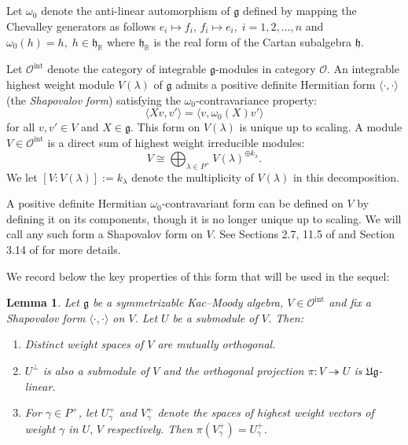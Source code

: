 \documentclass[12pt,reqno]{amsart}
\theoremstyle{plain}
\newtheorem{lemma}[theorem]{Lemma}
\theoremstyle{definition}
\theoremstyle{remark}
\theoremstyle{plain}
\newcommand{\cato}{\mathcal{O}}
\newcommand{\catoint}{\mathcal{O}^{\mathrm{int}}}
\newcommand{\lie}{\mathfrak}
\begin{document}
\subsection{}
Let $\omega_0$ denote the anti-linear automorphism of $\mathfrak g$ defined by mapping the Chevalley generators as follows $e_i\mapsto f_i, \,f_i\mapsto e_i, \;i=1,2,\ldots,n$ and $\omega_0(h)=h, \;h\in \mathfrak{h}_{\mathbb{R}}$ where ${\lie h}_\mathbb{R}$ is the real form of the Cartan subalgebra $\lie h$.

Let $\catoint$ denote the category of integrable $\lie g$-modules in category $\cato$. An integrable highest weight module $V(\lambda)$ of $\lie g$ admits a positive definite Hermitian form $\langle \cdot, \cdot \rangle$ (the {\em Shapovalov form}) satisfying the $\omega_0$-contravariance property:
 \[ \langle Xv, v' \rangle = \langle v, \omega_0(X) v' \rangle \]
    for all $v, v' \in V$ and $X \in \lie g$.
This form on $V(\lambda)$ is unique up to scaling. A module $V \in \catoint$ is a direct sum of highest weight irreducible modules:
\[ V \cong \bigoplus_{\lambda \in P^+} V(\lambda)^{\oplus k_\lambda}.\]
We let $[V:V(\lambda)] :=k_\lambda$ denote the multiplicity of $V(\lambda)$ in this decomposition.

A positive definite Hermitian $\omega_0$-contravariant form can be defined on $V$ by defining it on its components, though it is no longer unique up to scaling. We will call any such form a Shapovalov form on $V$.
See Sections 2.7, 11.5 of \cite{Kac} and Section 3.14 of \cite{Hum2} for more details.

We record below the key properties of this form that will be used in the sequel:
\begin{lemma}\label{lem:shap-props}
    Let $\lie g$  be a symmetrizable Kac--Moody algebra, $V \in \catoint$ and fix  a Shapovalov form $\langle \cdot, \cdot \rangle$ on $V$. Let $U$ be a submodule of $V$. Then:
    \begin{enumerate}
        \item Distinct weight spaces of $V$ are mutually orthogonal.
        \item $U^\perp$ is also a submodule of $V$ and 
        the orthogonal projection $\pi: V \twoheadrightarrow U$ is $\lie{Ug}$-linear. 
        \item For $\gamma \in P^+$, let $U^+_\gamma$ and $V^+_\gamma$ denote the spaces of highest weight vectors of weight $\gamma$ in $U, \, V$ respectively. Then $\pi(V^+_\gamma) = U^+_\gamma$.
    \end{enumerate}
\end{lemma}
\end{document}
